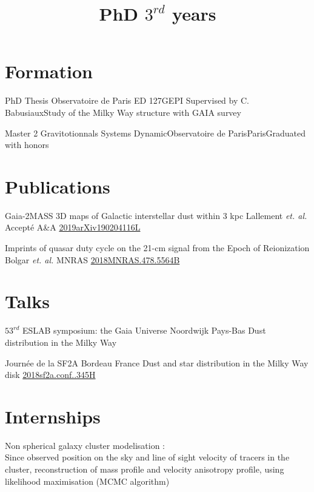 \documentclass{moderncv}
\title{PhD $3^{rd}$ years}
\begin{document}
\maketitle

\section{Formation}

 {PhD Thesis} {Observatoire de Paris ED 127}{GEPI}
{Supervised by C. Babusiaux}{Study of the Milky Way structure with GAIA survey}

 {Master 2 Gravitotionnals Systems Dynamic}{Observatoire de Paris}{Paris}{}{Graduated with honors}


\section{Publications}%
{Gaia-2MASS 3D maps of Galactic interstellar dust within 3 kpc}
{Lallement \textit{et. al.}}
{Accepté A\&A}
{\href{https://ui.adsabs.harvard.edu/\#abs/2019arXiv190204116L/abstract}{2019arXiv190204116L}}
{}

{Imprints of quasar duty cycle on the 21-cm signal from the Epoch of Reionization}
{Bolgar \textit{et. al.}}
{MNRAS}
{\href{https://ui.adsabs.harvard.edu/\#abs/2019arXiv190204116L/abstract}{2018MNRAS.478.5564B}}
{}

\section{Talks}
{$53^{rd}$ ESLAB symposium: the Gaia Universe}
{Noordwijk}
{Pays-Bas}
{Dust distribution in the Milky Way}
{}

{Journée de la SF2A}
{Bordeau}
{France}
{Dust and star distribution in the Milky Way disk}
{\href{https://ui.adsabs.harvard.edu/\#abs/2018sf2a.conf..345H/abstract}{2018sf2a.conf..345H}}

\section{Internships}

{Non spherical galaxy cluster modelisation :\\
Since observed position on the sky and line of sight velocity of tracers in the cluster, reconstruction of mass profile and velocity anisotropy profile, using likelihood maximisation (MCMC algorithm)}
\end{document}

